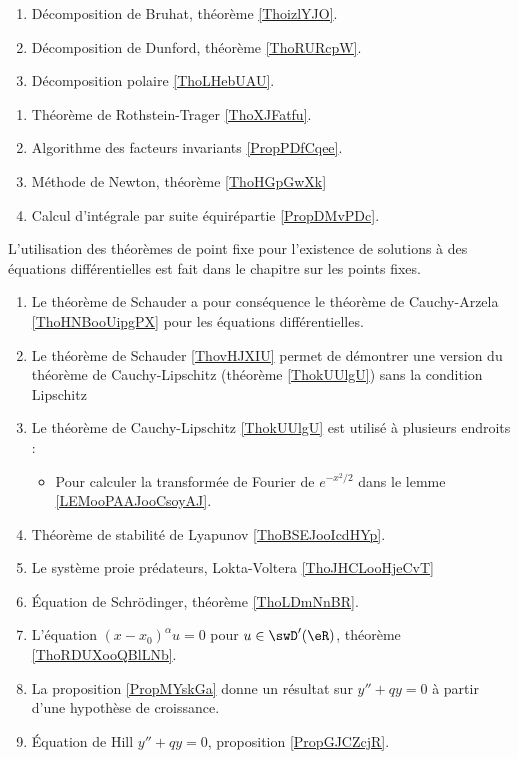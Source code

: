    \label{DECooWTAIooNkZAFg}
\begin{enumerate}
    \item 
        Décomposition de Bruhat, théorème \ref{ThoizlYJO}.
    \item 
        Décomposition de Dunford, théorème \ref{ThoRURcpW}. 
    \item 
        Décomposition polaire \ref{ThoLHebUAU}.
\end{enumerate}

\begin{enumerate}
    \item 
        Théorème de Rothstein-Trager \ref{ThoXJFatfu}.
    \item 
        Algorithme des facteurs invariants \ref{PropPDfCqee}.
    \item 
        Méthode de Newton, théorème \ref{ThoHGpGwXk}
    \item 
        Calcul d'intégrale par suite équirépartie \ref{PropDMvPDc}.
\end{enumerate}

L'utilisation des théorèmes de point fixe pour l'existence de solutions à des équations différentielles est fait dans le chapitre sur les points fixes.
\begin{enumerate}
    \item
            Le théorème de Schauder a pour conséquence le théorème de Cauchy-Arzela \ref{ThoHNBooUipgPX} pour les équations différentielles.
        \item
            Le théorème de Schauder \ref{ThovHJXIU} permet de démontrer une version du théorème de Cauchy-Lipschitz (théorème \ref{ThokUUlgU}) sans la condition Lipschitz
        \item
            Le théorème de Cauchy-Lipschitz \ref{ThokUUlgU} est utilisé à plusieurs endroits :
            \begin{itemize}
                \item 
                    Pour calculer la transformée de Fourier de \(  e^{-x^2/2}\) dans le lemme \ref{LEMooPAAJooCsoyAJ}.
            \end{itemize}
    \item
        Théorème de stabilité de Lyapunov \ref{ThoBSEJooIcdHYp}.
    \item
        Le système proie prédateurs, Lokta-Voltera \ref{ThoJHCLooHjeCvT}
    \item 
        Équation de Schrödinger, théorème \ref{ThoLDmNnBR}.
    \item 
        L'équation \( (x-x_0)^{\alpha}u=0\) pour \( u\in\swD'(\eR)\), théorème \ref{ThoRDUXooQBlLNb}.
    \item 
        La proposition \ref{PropMYskGa} donne un résultat sur \( y''+qy=0\) à partir d'une hypothèse de croissance.
    \item
        Équation de Hill \( y''+qy=0\), proposition \ref{PropGJCZcjR}.
\end{enumerate}

